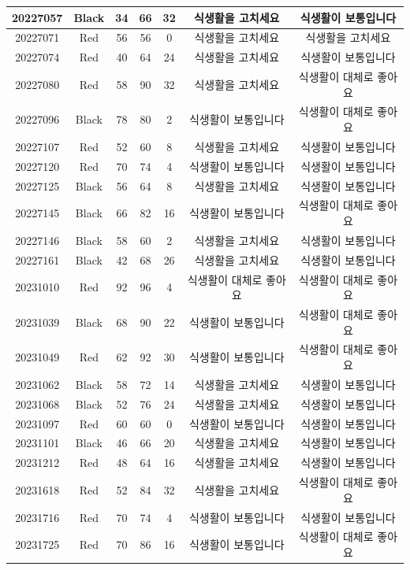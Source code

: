 \documentclass[
]{book}
\begin{document}
\begin{tabular}{c|c|c|c|c|c|c}
\hline
20227057 & Black & 34 & 66 & 32 & 식생활을 고치세요 & 식생활이 보통입니다\\
\hline
20227071 & Red & 56 & 56 & 0 & 식생활을 고치세요 & 식생활을 고치세요\\
\hline
20227074 & Red & 40 & 64 & 24 & 식생활을 고치세요 & 식생활이 보통입니다\\
\hline
20227080 & Red & 58 & 90 & 32 & 식생활을 고치세요 & 식생활이 대체로 좋아요\\
\hline
20227096 & Black & 78 & 80 & 2 & 식생활이 보통입니다 & 식생활이 대체로 좋아요\\
\hline
20227107 & Red & 52 & 60 & 8 & 식생활을 고치세요 & 식생활이 보통입니다\\
\hline
20227120 & Red & 70 & 74 & 4 & 식생활이 보통입니다 & 식생활이 보통입니다\\
\hline
20227125 & Black & 56 & 64 & 8 & 식생활을 고치세요 & 식생활이 보통입니다\\
\hline
20227145 & Black & 66 & 82 & 16 & 식생활이 보통입니다 & 식생활이 대체로 좋아요\\
\hline
20227146 & Black & 58 & 60 & 2 & 식생활을 고치세요 & 식생활이 보통입니다\\
\hline
20227161 & Black & 42 & 68 & 26 & 식생활을 고치세요 & 식생활이 보통입니다\\
\hline
20231010 & Red & 92 & 96 & 4 & 식생활이 대체로 좋아요 & 식생활이 대체로 좋아요\\
\hline
20231039 & Black & 68 & 90 & 22 & 식생활이 보통입니다 & 식생활이 대체로 좋아요\\
\hline
20231049 & Red & 62 & 92 & 30 & 식생활이 보통입니다 & 식생활이 대체로 좋아요\\
\hline
20231062 & Black & 58 & 72 & 14 & 식생활을 고치세요 & 식생활이 보통입니다\\
\hline
20231068 & Black & 52 & 76 & 24 & 식생활을 고치세요 & 식생활이 보통입니다\\
\hline
20231097 & Red & 60 & 60 & 0 & 식생활이 보통입니다 & 식생활이 보통입니다\\
\hline
20231101 & Black & 46 & 66 & 20 & 식생활을 고치세요 & 식생활이 보통입니다\\
\hline
20231212 & Red & 48 & 64 & 16 & 식생활을 고치세요 & 식생활이 보통입니다\\
\hline
20231618 & Red & 52 & 84 & 32 & 식생활을 고치세요 & 식생활이 대체로 좋아요\\
\hline
20231716 & Red & 70 & 74 & 4 & 식생활이 보통입니다 & 식생활이 보통입니다\\
\hline
20231725 & Red & 70 & 86 & 16 & 식생활이 보통입니다 & 식생활이 대체로 좋아요\\

\end{tabular}
\end{document}
